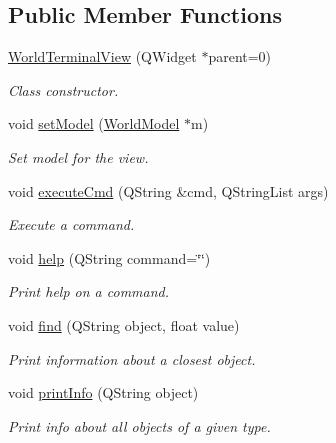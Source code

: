 \subsection*{Public Member Functions}
\begin{DoxyCompactItemize}
\item 
\hyperlink{classWorldTerminalView_a5cf7926b3cf66af1f036f976315fab99}{World\+Terminal\+View} (Q\+Widget $\ast$parent=0)
\begin{DoxyCompactList}\small\item\em Class constructor. \end{DoxyCompactList}\item 
void \hyperlink{classWorldTerminalView_ab9a76421814621d776d641e36946f0e4}{set\+Model} (\hyperlink{classWorldModel}{World\+Model} $\ast$m)
\begin{DoxyCompactList}\small\item\em Set model for the view. \end{DoxyCompactList}\item 
void \hyperlink{classWorldTerminalView_a8a52d3ddd8cef89f14123eb7c8fdaa41}{execute\+Cmd} (Q\+String \&cmd, Q\+String\+List args)
\begin{DoxyCompactList}\small\item\em Execute a command. \end{DoxyCompactList}\item 
void \hyperlink{classWorldTerminalView_a66913418f7408cb2d9abf989b1679163}{help} (Q\+String command=\char`\"{}\char`\"{})
\begin{DoxyCompactList}\small\item\em Print help on a command. \end{DoxyCompactList}\item 
void \hyperlink{classWorldTerminalView_a3b716b8dc01872822824e41115153742}{find} (Q\+String object, float value)
\begin{DoxyCompactList}\small\item\em Print information about a closest object. \end{DoxyCompactList}\item 
void \hyperlink{classWorldTerminalView_a549769ec34738ea2f4d39faddabeb0b3}{print\+Info} (Q\+String object)
\begin{DoxyCompactList}\small\item\em Print info about all objects of a given type. \end{DoxyCompactList}\end{DoxyCompactItemize}


